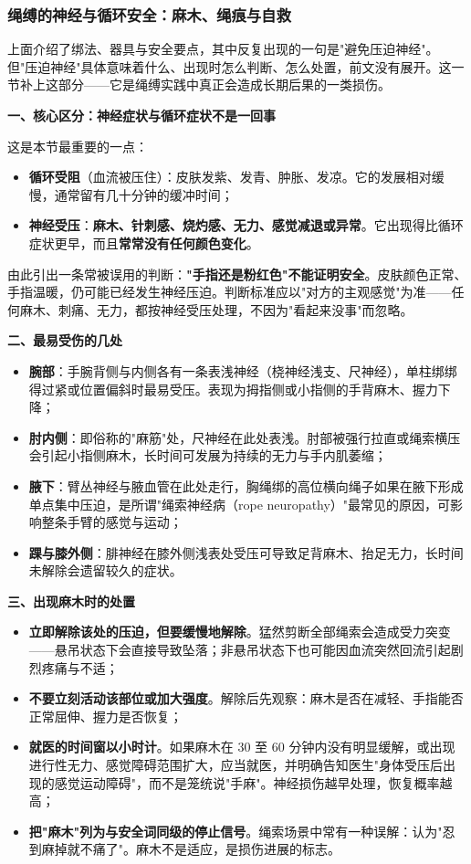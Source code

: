 \subsubsection{绳缚的神经与循环安全：麻木、绳痕与自救}

上面介绍了绑法、器具与安全要点，其中反复出现的一句是"避免压迫神经"。但"压迫神经"具体意味着什么、出现时怎么判断、怎么处置，前文没有展开。这一节补上这部分——它是绳缚实践中真正会造成长期后果的一类损伤。

\textbf{一、核心区分：神经症状与循环症状不是一回事}

这是本节最重要的一点：

\begin{itemize}
\item \textbf{循环受阻}（血流被压住）：皮肤发紫、发青、肿胀、发凉。它的发展相对缓慢，通常留有几十分钟的缓冲时间；
\item \textbf{神经受压}：\textbf{麻木、针刺感、烧灼感、无力、感觉减退或异常}。它出现得比循环症状更早，而且\textbf{常常没有任何颜色变化}。
\end{itemize}

由此引出一条常被误用的判断：\textbf{"手指还是粉红色"不能证明安全}。皮肤颜色正常、手指温暖，仍可能已经发生神经压迫。判断标准应以"对方的主观感觉"为准——任何麻木、刺痛、无力，都按神经受压处理，不因为"看起来没事"而忽略。

\textbf{二、最易受伤的几处}

\begin{itemize}
\item \textbf{腕部}：手腕背侧与内侧各有一条表浅神经（桡神经浅支、尺神经），单柱绑绑得过紧或位置偏斜时最易受压。表现为拇指侧或小指侧的手背麻木、握力下降；
\item \textbf{肘内侧}：即俗称的"麻筋"处，尺神经在此处表浅。肘部被强行拉直或绳索横压会引起小指侧麻木，长时间可发展为持续的无力与手内肌萎缩；
\item \textbf{腋下}：臂丛神经与腋血管在此处走行，胸绳绑的高位横向绳子如果在腋下形成单点集中压迫，是所谓"绳索神经病（rope neuropathy）"最常见的原因，可影响整条手臂的感觉与运动；
\item \textbf{踝与膝外侧}：腓神经在膝外侧浅表处受压可导致足背麻木、抬足无力，长时间未解除会遗留较久的症状。
\end{itemize}

\textbf{三、出现麻木时的处置}

\begin{itemize}
\item \textbf{立即解除该处的压迫，但要缓慢地解除}。猛然剪断全部绳索会造成受力突变——悬吊状态下会直接导致坠落；非悬吊状态下也可能因血流突然回流引起剧烈疼痛与不适；
\item \textbf{不要立刻活动该部位或加大强度}。解除后先观察：麻木是否在减轻、手指能否正常屈伸、握力是否恢复；
\item \textbf{就医的时间窗以小时计}。如果麻木在 30 至 60 分钟内没有明显缓解，或出现进行性无力、感觉障碍范围扩大，应当就医，并明确告知医生"身体受压后出现的感觉运动障碍"，而不是笼统说"手麻"。神经损伤越早处理，恢复概率越高；
\item \textbf{把"麻木"列为与安全词同级的停止信号}。绳索场景中常有一种误解：认为"忍到麻掉就不痛了"。麻木不是适应，是损伤进展的标志。
\end{itemize}

